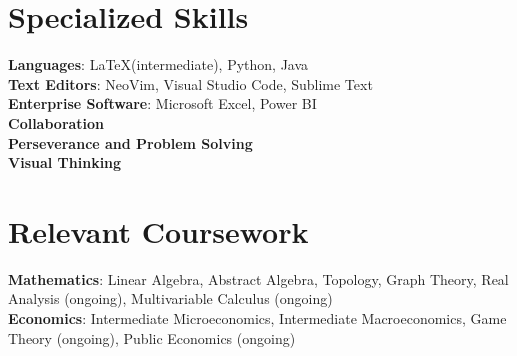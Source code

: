 \documentclass[letterpaper,11pt]{article}
\begin{document}
\section{Specialized Skills}
\begin{itemize}[leftmargin=0.15in, label={}]
    \normalsize{\item{
     \textbf{Languages}{: \LaTeX (intermediate), Python, Java} \\
     \textbf{Text Editors}{: NeoVim, Visual Studio Code, Sublime Text}\\
     \textbf{Enterprise Software}{: Microsoft Excel, Power BI}\\
     \textbf{Collaboration}{}\\
     \textbf{Perseverance and Problem Solving}{} \\
     \textbf{Visual Thinking}\\
    }}
 \end{itemize}

 \section{Relevant Coursework}
\begin{itemize}[leftmargin=0.15in, label={}]
    \normalsize{\item{
        \textbf{Mathematics}{: Linear Algebra, Abstract Algebra, Topology, Graph Theory, Real Analysis (ongoing), Multivariable Calculus (ongoing)}\\
        \textbf{Economics}{: Intermediate Microeconomics, Intermediate Macroeconomics, Game Theory (ongoing), Public Economics (ongoing)}\\
    }}    
 \end{itemize}
\end{document}
